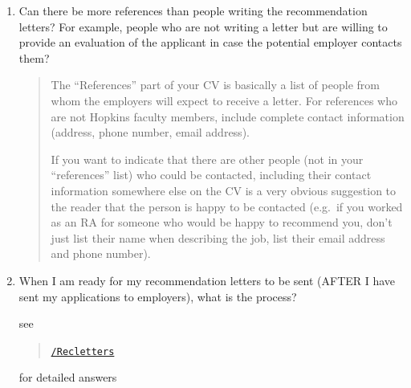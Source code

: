 \documentclass{\classes/econtex}
\begin{document}
\begin{enumerate}
\begin{quote}
    {\JMStaffName}~is prepared to handle different sets of letters to different categories of employers (usually, academic vs nonacademic) but you need to explicitly label those categories for them, and make SURE your letter writers label the letters clearly in the different categories when they send them to the JMStaff.  Like, maybe, letters for academic institutions should have \texttt{academic} in the name of the PDF.

    Depending on {\JMStaffName}'s bandwidth, you might ask for a \textit{few} special-case deviations from your usual set of letters.

    If the motivation is that you have a potential letter writer who has particular contacts at particular institutions that might be helpful, another (perhaps better) option is to have that writer email their contact at the institution directly, and send either a full letter or a personal email endorsement (or both).  This is more work for the letter writer, but is likely to be more effective than just having their letter included as (say) a fourth or, God forbid, fifth letter.

  \end{quote}
\item   Can there be more references than people writing the recommendation 
  letters? For example, people who are not writing a letter but are willing to provide 
  an evaluation of the applicant in case the potential employer contacts them?

  \begin{quote}
    The ``References'' part of your CV is basically a list of people from
    whom the employers will expect to receive a letter.  For references who
    are not Hopkins faculty members, include complete contact information
    (address, phone number, email address).

    If you want to indicate that there are other people (not in your
    ``references'' list) who could be contacted, including their contact
    information somewhere else on the CV is a very obvious suggestion to
    the reader that the person is happy to be contacted (e.g.\ if you
    worked as an RA for someone who would be happy to recommend you,
    don't just list their name when describing the job, list their email
    address and phone number).


  \end{quote}
\item  {} 
  When I am ready for my recommendation letters to be sent (AFTER I have
  sent my applications to employers), what is the process?

\noindent      see
\begin{quote}
    \href{\pageurl/RecLetters}{\texttt{\pageurl/Recletters}}
  \end{quote}
\noindent    for detailed answers
\end{enumerate}
\end{document}
